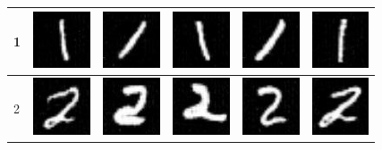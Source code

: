 \begin{table}[ht]
\begin{tabular}{|llllll|}
1 & \includegraphics[width=1.69cm, height=1.69cm]{Files/MNIST/0-1.png}  &\includegraphics[width=1.69cm, height=1.69cm]{Files/MNIST/1-3.png}   & \includegraphics[width=1.69cm, height=1.69cm]{Files/MNIST/2-5.png}  & \includegraphics[width=1.69cm, height=1.69cm]{Files/MNIST/5-1.png}  & \includegraphics[width=1.69cm, height=1.69cm]{Files/MNIST/7-5.png} \\ \hline

2 & \includegraphics[width=1.69cm, height=1.69cm]{Files/MNIST/0-2.png}  &\includegraphics[width=1.69cm, height=1.69cm]{Files/MNIST/1-4.png}   & \includegraphics[width=1.69cm, height=1.69cm]{Files/MNIST/2-6.png}  & \includegraphics[width=1.69cm, height=1.69cm]{Files/MNIST/5-2.png}  & \includegraphics[width=1.69cm, height=1.69cm]{Files/MNIST/6-4.png} \\ \hline


\end{tabular}
\end{table}
